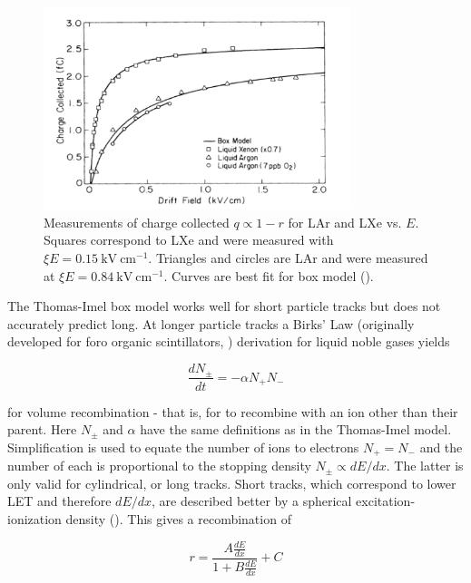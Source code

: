 \begin{figure}
\includegraphics[width=0.8\textwidth]{TIRecombination}
\caption{Measurements of charge collected $q \propto 1 - r$ for LAr and LXe vs. $E$.  Squares correspond to LXe and were measured with
$\xi E = 0.15\ \mathrm{kV\ cm^{-1}}$.  Triangles and circles are LAr and were measured at $\xi E = 0.84\ \mathrm{kV\ cm^{-1}}$.  Curves
are best fit for box model ().}
\label{fig:ti_recomb}
\end{figure}

The Thomas-Imel box model works well for short particle tracks but does not accurately predict long.  At longer particle tracks a Birks'
Law (originally developed for foro organic scintillators, ) derivation for liquid noble gases yields

\begin{equation}
\frac{dN_{\pm}}{dt} = -\alpha N_{+} N_{-}
\label{eq:birks_diff}
\end{equation}

\noindent for volume recombination - that is, for \electron to recombine with an ion other than their parent.  Here $N_{\pm}$ and
$\alpha$ have the same definitions as in the Thomas-Imel model.  Simplification is used to equate the number of ions to electrons
$N_{+} = N_{-}$ and the number of each is proportional to the stopping density $N_{\pm} \propto dE/dx$.  The latter is only valid for
cylindrical, or long tracks.  Short tracks, which correspond to lower LET and therefore $dE/dx$, are described better by a spherical
excitation-ionization density ().  This gives a recombination of

\begin{equation}
r = \frac{A \frac{dE}{dx}}{1 + B \frac{dE}{dx}} + C
\label{eq:birks_recomb}
\end{equation}

